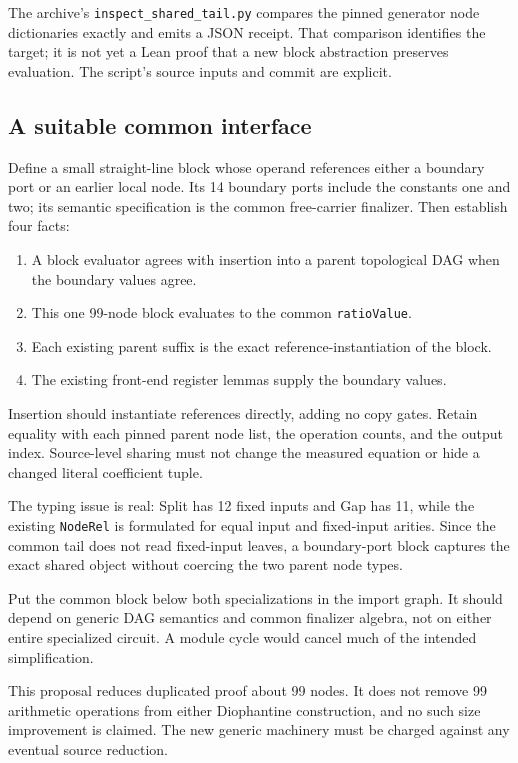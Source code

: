 \documentclass[11pt,letterpaper]{article}
\newcommand{\code}[1]{\nolinkurl{#1}}
\begin{document}
The archive's \code{inspect_shared_tail.py} compares the pinned generator
node dictionaries exactly and emits a JSON receipt. That comparison identifies
the target; it is not yet a Lean proof that a new block abstraction preserves
evaluation. The script's source inputs and commit are explicit.

\subsection{A suitable common interface}

Define a small straight-line block whose operand references either a boundary
port or an earlier local node. Its 14 boundary ports include the constants one
and two; its semantic specification is the common free-carrier finalizer.
Then establish four facts:

\begin{enumerate}
\item A block evaluator agrees with insertion into a parent topological DAG
when the boundary values agree.
\item This one 99-node block evaluates to the common \code{ratioValue}.
\item Each existing parent suffix is the exact reference-instantiation of
the block.
\item The existing front-end register lemmas supply the boundary values.
\end{enumerate}

Insertion should instantiate references directly, adding no copy gates.
Retain equality with each pinned parent node list, the operation counts, and
the output index. Source-level sharing must not change the measured equation
or hide a changed literal coefficient tuple.

The typing issue is real: Split has 12 fixed inputs and Gap has 11, while the
existing \code{NodeRel} is formulated for equal input and fixed-input arities.
Since the common tail does not read fixed-input leaves, a boundary-port block
captures the exact shared object without coercing the two parent node types.

Put the common block below both specializations in the import graph. It should
depend on generic DAG semantics and common finalizer algebra, not on either
entire specialized circuit. A module cycle would cancel much of the intended
simplification.

This proposal reduces duplicated proof about 99 nodes. It does not remove
99 arithmetic operations from either Diophantine construction, and no such
size improvement is claimed. The new generic machinery must be charged against
any eventual source reduction.
\end{document}
